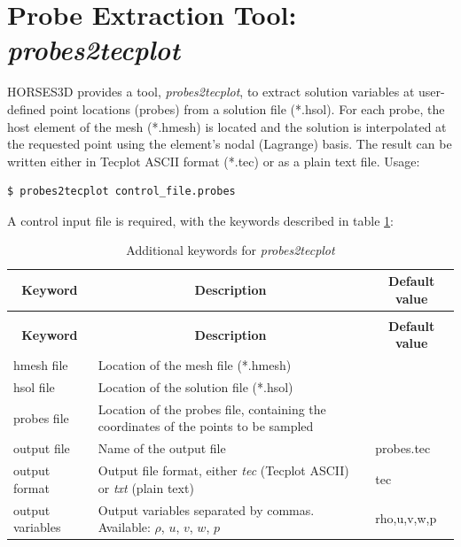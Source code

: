 \documentclass[a4paper,10pt]{report}
\begin{document}
\section{Probe Extraction Tool: \textit{probes2tecplot}}

HORSES3D provides a tool, \textit{probes2tecplot}, to extract solution variables at user-defined point locations (probes) from a solution file (*.hsol). For each probe, the host element of the mesh (*.hmesh) is located and the solution is interpolated at the requested point using the element's nodal (Lagrange) basis. The result can be written either in Tecplot ASCII format (*.tec) or as a plain text file. Usage:

\begin{lstlisting}[language=bash]
  $ probes2tecplot control_file.probes
\end{lstlisting}

A control input file is required, with the keywords described in table \ref{tab:probes2tecplot}:

\begin{longtable}{|p{3.2cm}|p{9.5cm}|p{2.7cm}|}
\caption{Keywords for \textit{probes2tecplot}.} \label{tab:probes2tecplot} \\
\hline
\multicolumn{1}{|c|}{\textbf{Keyword}} & \multicolumn{1}{c|}{\textbf{Description}} & \multicolumn{1}{c|}{\textbf{Default value}} \\ \hline
\endfirsthead

\caption{Additional keywords for \textit{probes2tecplot}} \\
\hline
\multicolumn{1}{|c|}{\textbf{Keyword}} & \multicolumn{1}{c|}{\textbf{Description}} & \multicolumn{1}{c|}{\textbf{Default value}} \\ \hline
\endhead

hmesh file 		& Location of the mesh file (*.hmesh) 	&  \\ \hline
hsol file 		& Location of the solution file (*.hsol) 	&  \\ \hline
probes file 		& Location of the probes file, containing the coordinates of the points to be sampled 	&  \\ \hline
output file 		& Name of the output file 	& probes.tec \\ \hline
output format 		& Output file format, either \textit{tec} (Tecplot ASCII) or \textit{txt} (plain text) 	& tec \\ \hline
output variables 	& Output variables separated by commas. Available: $\rho$, $u$, $v$, $w$, $p$ 	& rho,u,v,w,p \\ \hline
\end{longtable}
\end{document}
